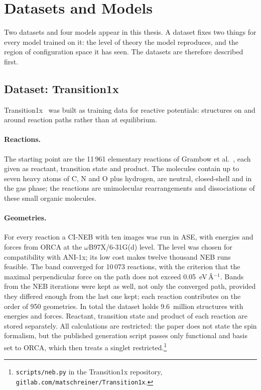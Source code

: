 \section{Datasets and Models}
\label{sec:background-datasets}

Two datasets and four models appear in this thesis. A dataset fixes two
things for every model trained on it: the level of theory the model
reproduces, and the region of configuration space it has seen. The
datasets are therefore described first.

\subsection{Dataset: Transition1x}
\label{sec:dataset-t1x}

Transition1x~\cite{schreiner2022} was built as training data for reactive
potentials: structures on and around reaction paths rather than at
equilibrium.

\paragraph{Reactions.} The starting point are the 11\,961 elementary
reactions of Grambow et al.~\cite{grambow2020}, each given as reactant,
transition state and product. The molecules contain up to seven heavy
atoms of C, N and O plus hydrogen, are neutral, closed-shell and in the
gas phase; the reactions are unimolecular rearrangements and
dissociations of these small organic molecules.

\paragraph{Geometries.} For every reaction a CI-NEB with ten images was
run in ASE, with energies and forces from ORCA at the
\mbox{$\omega$B97X/6-31G(d)} level. The level was chosen for
compatibility with ANI-1x; its low cost makes twelve thousand NEB runs
feasible. The band converged for
10\,073 reactions, with the criterion that the maximal perpendicular force
on the path does not exceed 0.05~eV\,\AA$^{-1}$. Bands from the NEB
iterations were kept as well, not only the converged path, provided
they differed enough from the last one kept; each reaction contributes
on the order of 950 geometries. In
total the dataset holds 9.6~million structures with energies and forces.
Reactant, transition state and product of each reaction are stored
separately. All calculations are restricted: the paper does not state
the spin formalism, but the published generation script passes only
functional and basis set to ORCA, which then treats a singlet
restricted.\footnote{\texttt{scripts/neb.py} in the Transition1x
repository, \texttt{gitlab.com/matschreiner/Transition1x}.}


